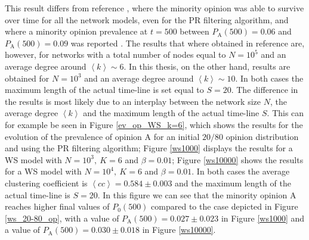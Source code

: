 \documentclass[11 pt , letterpaper , twoside , openright]{book}
\begin{document}
This result differs from reference \cite{Perra2019}, where the minority opinion was able to survive over time for all the network models, even for the PR filtering algorithm, and where a minority opinion prevalence at $t=500$ between $P_\text{A}(500) = 0.06$ and $P_\text{A}(500) = 0.09$ was reported \cite{Perra2019}. The results that where obtained in reference \cite{Perra2019} are, however, for networks with a total number of nodes equal to $N = 10^5$ and an average degree around $\left<k\right> \sim 6$. In this thesis, on the other hand, results are obtained for $N=10^3$ and an average degree around $\left<k\right> \sim 10$. In both cases the maximum length of the actual time-line is set equal to $S=20$. The difference in the results is most likely due to an interplay between the network size $N$, the average degree $\left<k\right>$ and the maximum length of the actual time-line $S$. This can for example be seen in Figure \ref{ev_op_WS_k=6}, which shows the results for the evolution of the prevalence of opinion A for an initial $20/80$ opinion distribution and using the PR filtering algorithm; Figure \ref{ws1000} displays the results for a WS model with $N=10^3,\ K=6$ and $\beta=0.01$; Figure \ref{ws10000} shows the results for a WS model with $N=10^4,\ K=6$ and $\beta=0.01$. In both cases the average clustering coefficient is $\left<cc\right> = 0.584 \pm 0.003$ and the maximum length of the actual time-line is $S=20$. In this figure we can see that the minority opinion A reaches higher final values of $P_0(500)$ compared to the case depicted in Figure \ref{ws_20-80_op}, with a value of $P_\text{A}(500) = 0.027 \pm 0.023$ in Figure \ref{ws1000} and a value of $P_\text{A}(500) = 0.030 \pm 0.018$ in Figure \ref{ws10000}.
\end{document}
